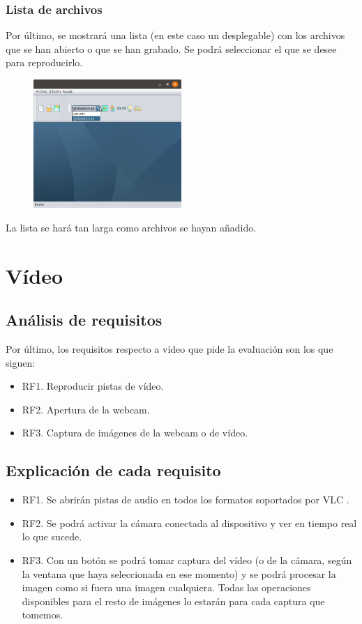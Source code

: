 \documentclass[11pt,a4paper]{article}
\begin{document}
\subsubsection{Lista de archivos}
Por último, se mostrará una lista (en este caso un desplegable) con los archivos que se han abierto o que se han grabado. Se podrá seleccionar el que se desee para reproducirlo.

\begin{figure}[H]
\centering
	\includegraphics[width=0.5\textwidth]{img/lista.png}
\end{figure}

La lista se hará tan larga como archivos se hayan añadido.

\newpage

\section{Vídeo}

\subsection{Análisis de requisitos}
Por último, los requisitos respecto a vídeo que pide la evaluación son los que siguen:

\begin{itemize}
	\item RF1. Reproducir pistas de vídeo.
	\item RF2. Apertura de la webcam.
	\item RF3. Captura de imágenes de la webcam o de vídeo.
\end{itemize}

\subsection{Explicación de cada requisito}

\begin{itemize}
	\item RF1. Se abrirán pistas de audio en todos los formatos soportados por VLC \footnotemark .
	\item RF2. Se podrá activar la cámara conectada al dispositivo y ver en tiempo real lo que sucede.
	\item RF3. Con un botón se podrá tomar captura del vídeo (o de la cámara, según la ventana que haya seleccionada en ese momento) y se podrá procesar la imagen como si fuera una imagen cualquiera. Todas las operaciones disponibles para el resto de imágenes lo estarán para cada captura que tomemos.
\end{itemize}
\end{document}
